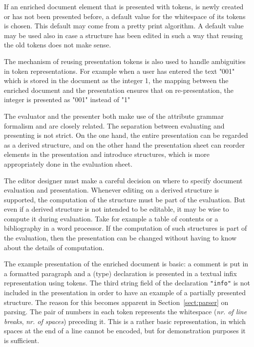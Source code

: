 If an enriched document element that is presented with tokens, is newly created or has not been presented before, a default value for the whitespace of its tokens is chosen. This default may come from a pretty print algorithm. A default value may be used also in case a structure has been edited in such a way that reusing the old tokens does not make sense.

The mechanism of reusing presentation tokens is also used to handle ambiguities in token representations. For example when a user has entered the text "001" which is stored in the document as the integer 1, the mapping between the enriched document and the presentation ensures that on re-presentation, the integer is presented as "001" instead of "1"

The evaluator and the presenter both make use of the attribute grammar formalism and are closely related. The separation between evaluating and presenting is not strict. On the one hand, the entire presentation can be regarded as a derived structure, and on the other hand the presentation sheet can reorder elements in the presentation and introduce structures, which is more appropriately done in the evaluation sheet. 

The editor designer must make a careful decision on where to specify document evaluation and presentation. Whenever editing on a derived structure is supported, the computation of the structure must be part of the evaluation. But even if a derived structure is not intended to be editable, it may be wise to compute it during evaluation. Take for example a table of contents or a bibliography in a word processor. If the computation of such structures is part of the evaluation, then the presentation can be changed without having to know about the details of computation.

 The example presentation of the enriched document is basic: a comment is put in a formatted paragraph and a (type) declaration is presented in a textual infix representation using tokens. The third string field of the declaration \verb|"info"| is not included in the presentation in order to have an example of a partially presented structure. The reason for this becomes apparent in Section~\ref{sect:parser} on parsing. The pair of numbers in each token represents the whitespace ({\em nr. of line breaks}, {\em nr. of spaces}) preceding it. This is a rather basic representation, in which spaces at the end of a line cannot be encoded, but for demonstration purposes it is sufficient.

